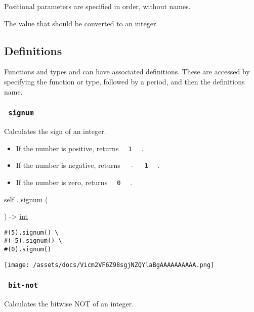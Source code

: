 \label{constructor-value-positional-tooltip}
Positional parameters are specified in order, without names.

The value that should be converted to an integer.

\subsection{\texorpdfstring{{ Definitions
}}{ Definitions }}\label{definitions}

\label{definitions-tooltip}
Functions and types and can have associated definitions. These are
accessed by specifying the function or type, followed by a period, and
then the definition\textquotesingle s name.

\subsubsection{\texorpdfstring{\texttt{\ signum\ }}{ signum }}\label{definitions-signum}

Calculates the sign of an integer.

\begin{itemize}
\tightlist
\item
  If the number is positive, returns
  \texttt{\ }{\texttt{\ 1\ }}\texttt{\ } .
\item
  If the number is negative, returns
  \texttt{\ }{\texttt{\ -\ }}\texttt{\ }{\texttt{\ 1\ }}\texttt{\ } .
\item
  If the number is zero, returns \texttt{\ }{\texttt{\ 0\ }}\texttt{\ }
  .
\end{itemize}

self { . } { signum } (

) -\textgreater{} \href{/docs/reference/foundations/int/}{int}

\begin{verbatim}
#(5).signum() \
#(-5).signum() \
#(0).signum()
\end{verbatim}

\texttt{[image: /assets/docs/Vicm2VF6Z98sgjNZQYlaBgAAAAAAAAAA.png]}

\subsubsection{\texorpdfstring{\texttt{\ bit-not\ }}{ bit-not }}\label{definitions-bit-not}

Calculates the bitwise NOT of an integer.

